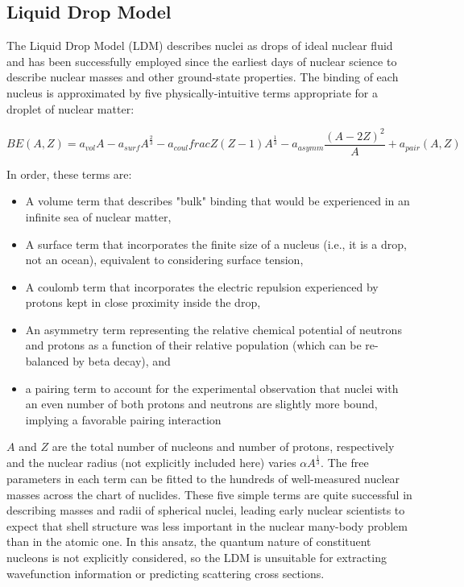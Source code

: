 \subsection{Liquid Drop Model}

The Liquid Drop Model (LDM) describes nuclei as drops of ideal nuclear fluid and
has been successfully employed since the earliest days of nuclear science to
describe nuclear masses and other ground-state properties. The binding of each
nucleus is approximated by five physically-intuitive terms appropriate for
a droplet of nuclear matter:

\begin{equation} \label{LDM}
    BE(A,Z) = a_{vol}A - a_{surf}A^{\frac{2}{3}}
    -a_{coul}frac{Z(Z-1)}{A^{\frac{1}{3}}}-a_{asymm}\frac{(A-2Z)^{2}}{A}  +
        a_{pair}(A,Z)
\end{equation}

\noindent
In order, these terms are:
\begin{itemize}
    \item A volume term that describes "bulk" binding that would be experienced in an
        infinite sea of nuclear matter,
    \item A surface term that incorporates the finite size of a nucleus (i.e., it is a
        drop, not an ocean), equivalent to considering surface tension,
    \item A coulomb term that incorporates the electric repulsion experienced by protons
        kept in close proximity inside the drop,
    \item An asymmetry term representing the relative chemical potential of neutrons and
        protons as a function of their relative population (which can be re-balanced by
        beta decay), and
    \item a pairing term to account for the experimental observation that nuclei with an
        even number of both protons and neutrons are slightly more bound, implying a
        favorable pairing interaction
\end{itemize}
$A$ and $Z$ are the total number of nucleons and number of protons,
respectively and the nuclear radius (not explicitly included here) varies
$\alpha A^{\frac{1}{3}}$. The free parameters in each term can be fitted to the
hundreds of well-measured nuclear masses
across the chart of nuclides. These five simple terms are quite successful
in describing masses and radii of spherical nuclei, leading early nuclear
scientists to expect that shell structure was less important in the nuclear
many-body problem than in the atomic one. In this ansatz, the quantum
nature of constituent nucleons is not explicitly considered, so the LDM is  
unsuitable for extracting wavefunction information or predicting scattering
cross sections.


